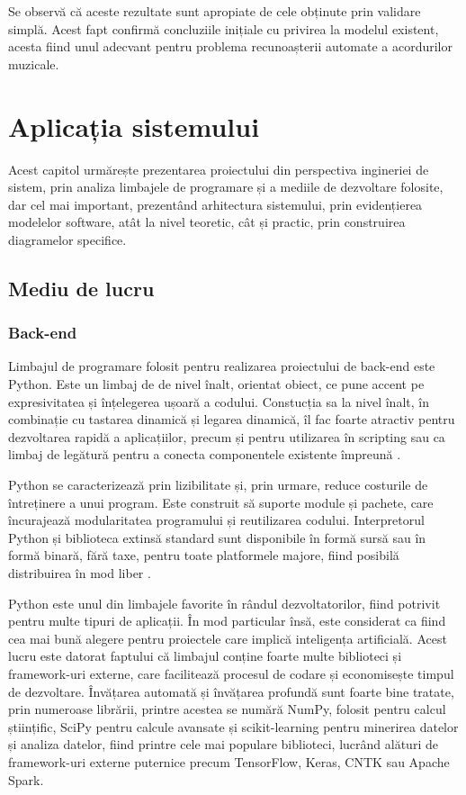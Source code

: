 \documentclass[a4paper,12pt]{report}
\begin{document}
Se observă că aceste rezultate sunt apropiate de cele obținute prin validare simplă.
Acest fapt confirmă concluziile inițiale cu privirea la modelul existent, acesta fiind 
unul adecvant pentru problema recunoașterii automate a acordurilor muzicale. 


\chapter{Aplicația sistemului}
Acest capitol urmărește prezentarea proiectului din 
perspectiva ingineriei de sistem, prin analiza 
limbajele de programare și a mediile de dezvoltare folosite, 
dar cel mai important, prezentând arhitectura sistemului,
prin evidențierea modelelor software, atât la nivel teoretic, 
cât și practic, prin construirea diagramelor specifice.
\section{Mediu de lucru}
\subsection{Back-end}

Limbajul de programare folosit pentru realizarea proiectului de back-end este Python.
Este un limbaj de de nivel înalt, orientat obiect, ce 
pune accent pe expresivitatea și înțelegerea ușoară a codului.
Constucția sa la nivel înalt, în combinație cu tastarea dinamică și
legarea dinamică, îl fac foarte atractiv pentru dezvoltarea rapidă a aplicațiilor,
precum și pentru utilizarea în scripting sau ca limbaj de legătură pentru 
a conecta componentele existente împreună \cite{WEBSITE:python}.

Python se caracterizează prin lizibilitate și, prin urmare, reduce costurile 
de întreținere a unui program. Este construit să suporte module și pachete, 
care încurajează modularitatea programului și reutilizarea codului. 
Interpretorul Python și biblioteca extinsă standard sunt disponibile 
în formă sursă sau în formă binară, fără taxe, pentru toate platformele 
majore, fiind posibilă distribuirea în mod liber \cite{WEBSITE:python}.

Python este unul din limbajele favorite în rândul dezvoltatorilor, fiind 
potrivit pentru multe tipuri de aplicații. În mod particular însă, 
este considerat ca fiind cea mai bună alegere pentru proiectele care implică 
inteligența artificială. Acest lucru este datorat faptului că limbajul 
conține foarte multe biblioteci și framework-uri externe, care facilitează 
procesul de codare și economisește timpul de dezvoltare. Învățarea automată 
și învățarea profundă sunt foarte bine tratate, prin numeroase librării,
printre acestea se numără NumPy, folosit pentru calcul științific, 
SciPy pentru calcule avansate și 
scikit-learning pentru minerirea datelor și analiza datelor, 
fiind printre cele mai populare biblioteci, 
lucrând alături de framework-uri externe puternice precum TensorFlow, 
Keras, CNTK sau Apache Spark.
\end{document}
